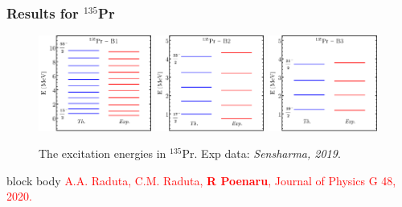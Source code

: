 \documentclass{beamer}
\begin{document}
\begin{frame}
	\frametitle{Results for $^{135}$Pr}
	\begin{figure}
		\centering
		\includegraphics[width=0.33\textwidth]{figures/new-boson/135Pr-New-Boson-Band1-Energies.pdf}
		\includegraphics[width=0.32\textwidth]{figures/new-boson/135Pr-New-Boson-Band2-Energies.pdf}
		\includegraphics[width=0.32\textwidth]{figures/new-boson/135Pr-New-Boson-Band3-Energies.pdf}
		\caption{The excitation energies in $^{135}$Pr. Exp data: \textit{Sensharma, 2019}.}
	\end{figure}
	\begin{table}
		\centering
	\end{table}
	\begin{beamercolorbox}[rounded=true,shadow=false, wd=\linewidth,]{block body}
		\centering
		\textcolor{red}{\footnotesize{A.A. Raduta, C.M. Raduta, \textbf{R Poenaru}, Journal of Physics G 48, 2020.}}
	\end{beamercolorbox}
\end{frame}
\end{document}

